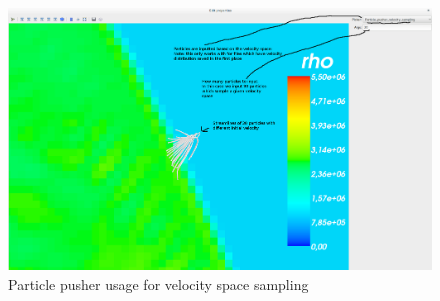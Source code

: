 \documentclass[a4paper,10pt]{article}
\begin{document}
\begin{figure}[H]
 \centering
 \includegraphics[width=\textwidth]{../images/particlepushersampling.png}
 \caption{Particle pusher usage for velocity space sampling}
 \label{fig:particle2}
\end{figure}
\end{document}

